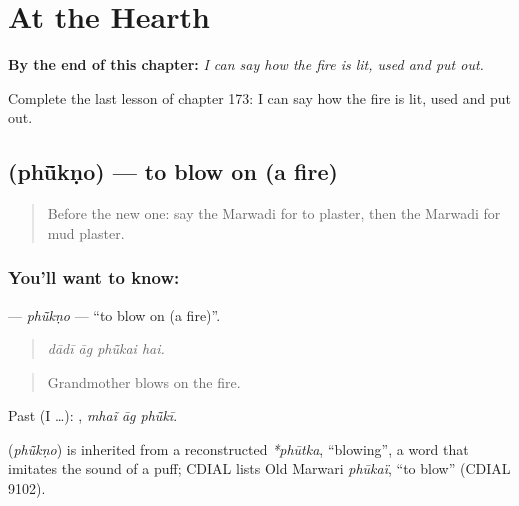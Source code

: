 
\chapter{At the Hearth}
\label{ch:mw-at-the-hearth}

\begin{chapteropening}
\textbf{By the end of this chapter:} \emph{I can say how the fire is lit, used and put out.}

Complete the last lesson of chapter 173: I can say how the fire is lit, used and put out.
\end{chapteropening}

\section[\texorpdfstring{\mw{फूंकणो} (phū̃kṇo)}{फूंकणो (phū̃kṇo)}]{ (phū̃kṇo) — to blow on (a fire)}

\label{lesson:MW-C173-phukno}



\begin{quote}
Before the new one: say the Marwadi for to plaster, then the Marwadi for mud plaster.
\end{quote}

\subsection*{You'll want to know: }
\textbf{} — \emph{phū̃kṇo} — \textquotedblleft{}to blow on (a fire)\textquotedblright{}.

\begin{quote}
   
\end{quote}

\begin{quote}
\emph{dādī āg phū̃kai hai.}
\end{quote}

\begin{quote}
Grandmother blows on the fire.
\end{quote}

Past (I …):   , \emph{mhaĩ āg phū̃kī}.

\begin{cousinweb}
\textbf{} (\emph{phū̃kṇo}) is inherited from a reconstructed \emph{*phūtka}, \textquotedblleft{}blowing\textquotedblright{}, a word that imitates the sound of a puff; CDIAL lists Old Marwari \emph{phūkaï}, \textquotedblleft{}to blow\textquotedblright{} (CDIAL 9102).
\end{cousinweb}

